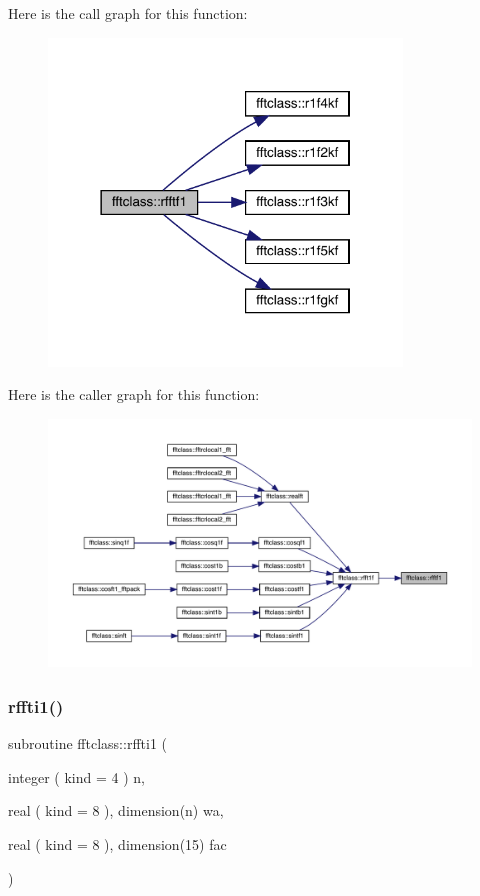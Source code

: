 Here is the call graph for this function\+:\nopagebreak
\begin{figure}[H]
\begin{center}
\leavevmode
\includegraphics[width=266pt]{namespacefftclass_af9f24f143ca02395c91f7757343e8003_cgraph}
\end{center}
\end{figure}
Here is the caller graph for this function\+:\nopagebreak
\begin{figure}[H]
\begin{center}
\leavevmode
\includegraphics[width=350pt]{namespacefftclass_af9f24f143ca02395c91f7757343e8003_icgraph}
\end{center}
\end{figure}
\mbox{\label{namespacefftclass_a122822a405cd96e5df936acaad731746}} 
\subsubsection{\texorpdfstring{rffti1()}{rffti1()}}
{\footnotesize\ttfamily subroutine fftclass\+::rffti1 (\begin{DoxyParamCaption}\item[{integer ( kind = 4 )}]{n,  }\item[{real ( kind = 8 ), dimension(n)}]{wa,  }\item[{real ( kind = 8 ), dimension(15)}]{fac }\end{DoxyParamCaption})}

